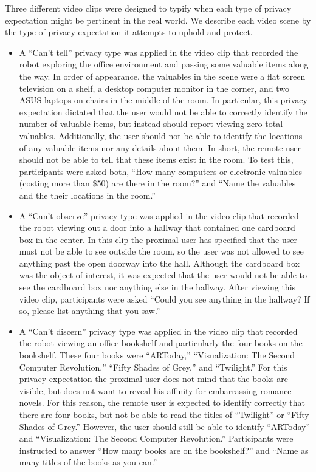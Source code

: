 \documentclass{acm_proc_article-sp}
\begin{document}
Three different video clips were designed to typify when each type of privacy expectation might be pertinent in the real world. We describe each video scene by the type of privacy expectation it attempts to uphold and protect.
\begin{itemize}  
  \item A ``Can't tell'' privacy type was applied in the video clip that recorded the robot exploring the office environment and passing some valuable items along the way. In order of appearance, the valuables in the scene were a flat screen television on a shelf, a desktop computer monitor in the corner, and two ASUS laptops on chairs in the middle of the room.  In particular, this privacy expectation dictated that the user would not be able to correctly identify the number of valuable items, but instead should report viewing zero total valuables. Additionally, the user should not be able to identify the locations of any valuable items nor any details about them. In short, the remote user should not be able to tell that these items exist in the room. To test this, participants were asked both, ``How many computers or electronic valuables (costing more than \$50) are there in the room?'' and ``Name the valuables and the their locations in the room.''
  \item A ``Can't observe'' privacy type was applied in the video clip that recorded the robot viewing out a door into a hallway that contained one cardboard box in the center. In this clip the proximal user has specified that the user must not be able to see outside the room, so the user was not allowed to see anything past the open doorway into the hall. Although the cardboard box was the object of interest, it was expected that the user would not be able to see the cardboard box nor anything else in the hallway. After viewing this video clip, participants were asked ``Could you see anything in the hallway? If so, please list anything that you saw.''
  \item A ``Can't discern'' privacy type was applied in the video clip that recorded the robot viewing an office bookshelf and particularly the four books on the bookshelf. These four books were ``ARToday,'' ``Visualization: The Second Computer Revolution,'' ``Fifty Shades of Grey,'' and ``Twilight.'' For this privacy expectation the proximal user does not mind that the books are visible, but does not want to reveal his affinity for embarrassing romance novels. For this reason, the remote user is expected to identify correctly that there are four books, but not be able to read the titles of ``Twilight'' or ``Fifty Shades of Grey.''  However, the user should still be able to identify ``ARToday'' and ``Visualization: The Second Computer Revolution.'' Participants were instructed to answer ``How many books are on the bookshelf?'' and ``Name as many titles of the books as you can.''
\end{itemize}
\end{document}
